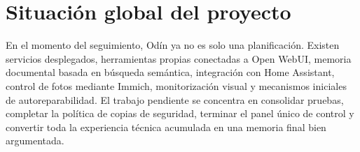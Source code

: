 \section{Situación global del proyecto}
En el momento del seguimiento, Odín ya no es solo una planificación. Existen servicios desplegados, herramientas propias conectadas a Open WebUI, memoria documental basada en búsqueda semántica, integración con Home Assistant, control de fotos mediante Immich, monitorización visual y mecanismos iniciales de autoreparabilidad. El trabajo pendiente se concentra en consolidar pruebas, completar la política de copias de seguridad, terminar el panel único de control y convertir toda la experiencia técnica acumulada en una memoria final bien argumentada.
